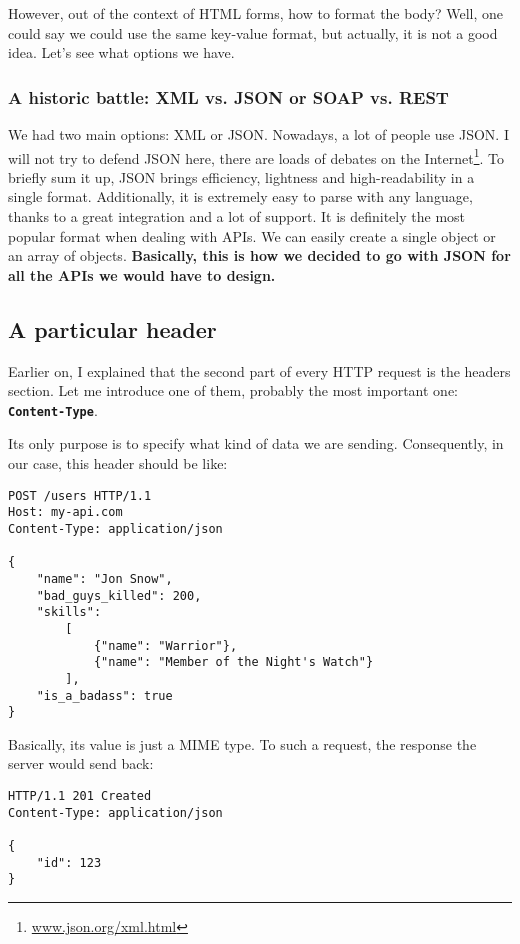 However, out of the context of HTML forms, how to format the body? Well, one could say we could use the same key-value format, but actually, it is not a good idea. Let's see what options we have.

\subsubsection{A historic battle: XML vs. JSON or SOAP vs. REST}

We had two main options: XML or JSON. Nowadays, a lot of people use JSON. I will not try to defend JSON here, there are loads of debates on the Internet\footnote{\href{http://www.json.org/xml.html}{www.json.org/xml.html}}. To briefly sum it up, JSON brings efficiency, lightness and high-readability in a single format. Additionally, it is extremely easy to parse with any language, thanks to a great integration and a lot of support. It is definitely the most popular format when dealing with APIs. We can easily create a single object or an array of objects. \textbf{Basically, this is how we decided to go with JSON for all the APIs we would have to design.}

\subsection{A particular header}

Earlier on, I explained that the second part of every HTTP request is the headers section. Let me introduce one of them, probably the most important one: \textbf{\lstinline{Content-Type}}.

\medskip

Its only purpose is to specify what kind of data we are sending. Consequently, in our case, this header should be like:

\begin{lstlisting}
POST /users HTTP/1.1
Host: my-api.com
Content-Type: application/json

{
    "name": "Jon Snow",
    "bad_guys_killed": 200,
    "skills":
        [
            {"name": "Warrior"},
            {"name": "Member of the Night's Watch"}
        ],
    "is_a_badass": true
}
\end{lstlisting}

Basically, its value is just a MIME type. To such a request, the response the server would send back:

\begin{lstlisting}
HTTP/1.1 201 Created
Content-Type: application/json

{
    "id": 123
}
\end{lstlisting}

